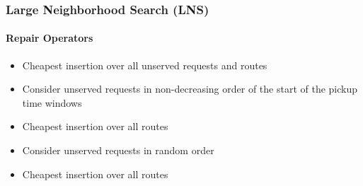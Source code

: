 \documentclass[aspectratio=1610]{beamer}
\begin{document}
\begin{frame}
  \frametitle{Large Neighborhood Search (LNS)}
  \framesubtitle{Repair Operators}
  
\begin{itemize}
	\item Cheapest insertion over all unserved requests and routes 
\end{itemize}

\medskip

\begin{itemize}
	\item Consider unserved requests in non-decreasing order of the start of the pickup time windows 
	\item Cheapest insertion over all routes 
\end{itemize}

\medskip

\begin{itemize}
	\item Consider unserved requests in random order
	\item Cheapest insertion over all routes 
\end{itemize}

\end{frame}
\end{document}

